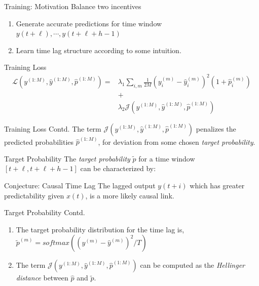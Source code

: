 \documentclass{beamer}
\begin{document}
\begin{frame}{Training: Motivation}
Balance two incentives

\begin{enumerate}
    \item Generate accurate predictions for time window $y(t+\ell), \cdots, y(t+\ell+h-1)$
    \newline
    \item Learn time lag structure according to some intuition.
\end{enumerate}
\end{frame}

\begin{frame}{Training Loss}
\begin{align*}
\mathcal{L}(y^{(1:M)}, \hat{y}^{(1:M)}, \hat{p}^{(1:M)}) = &\lambda_1 \sum_{i,m}{\frac{1}{2M} (y^{(m)}_{i} - \hat{y}^{(m)}_{i})^2 (1 + \hat{p}^{(m)}_i)} \\ &+ \\ &\lambda_2 \mathcal{J}(y^{(1:M)}, \hat{y}^{(1:M)}, \hat{p}^{(1:M)})
\end{align*}
\end{frame}

\begin{frame}{Training Loss Contd.}
The term $\mathcal{J}(y^{(1:M)}, \hat{y}^{(1:M)}, \hat{p}^{(1:M)})$ penalizes the predicted probabilities $\hat{p}^{(1:M)}$, for deviation from some chosen \textit{target probability}.
    
\end{frame}

\begin{frame}{Target Probability}
The \textit{target probability} $\widetilde{p}$ for a time window $[t+\ell, t+\ell+h-1]$ can be characterized by:
\newline

\begin{block}{Conjecture: Causal Time Lag}
The lagged output $y(t+i)$ which has greater predictability given $x(t)$, is a more likely causal link. 
\end{block}

    
\end{frame}


\begin{frame}{Target Probability Contd.}

\begin{enumerate}
\item The target probability distribution for the time lag is, $\widetilde{p}^{(m)} = softmax( (y^{(m)} - \hat{y}^{(m)})^{2}/T )$
\newline
\item The term $\mathcal{J}(y^{(1:M)}, \hat{y}^{(1:M)}, \hat{p}^{(1:M)})$ can be computed as the \emph{Hellinger distance} between $\hat{p}$ and $\widetilde{p}$.
\end{enumerate}
\end{frame}
\end{document}
